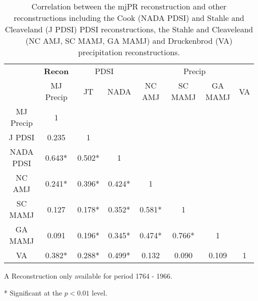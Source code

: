 \begin{table}
  \begin{center}
    \begin{threeparttable}[b]
      \begin{tabular}{cccccccc}
\toprule
 & \textbf{Recon} & \multicolumn{2}{c}{PDSI} & \multicolumn{4}{c}{Precip} \\ \cmidrule(lr){2-2} \cmidrule(lr){3-4} \cmidrule(lr){5-8}
 & MJ Precip & JT & NADA & NC AMJ & SC MAMJ & GA MAMJ & VA\tnote{A} \\  \midrule
MJ Precip &  1      & & & & & & \\
J PDSI    &  0.235  & 1      &        &         &        &       &   \\ 
NADA PDSI &  0.643* & 0.502* & 1      &         &        &       &   \\ 
NC AMJ    &  0.241* & 0.396* & 0.424* & 1       &        &       &   \\ 
SC MAMJ   &  0.127  & 0.178* & 0.352* & 0.581*  &  1     &       &   \\ 
GA MAMJ   &  0.091  & 0.196* & 0.345* & 0.474*  & 0.766* & 1     &   \\ 
VA        &  0.382* & 0.288* & 0.499* & 0.132   & 0.090  & 0.109 & 1 \\ \bottomrule
      \end{tabular}
      \caption{Correlation between the mjPR reconstruction and other reconstructions including the Cook (NADA PDSI) and Stahle and Cleaveland (J PDSI) PDSI reconstructions, the Stahle and Cleaveleand (NC AMJ, SC MAMJ, GA MAMJ) and Druckenbrod (VA) precipitation reconstructions.}
      \begin{tablenotes}
      \item [A] Reconstruction only available for period 1764 - 1966.
      \item [*] Significant at the $p<0.01$ level.
      \end{tablenotes}
    \end{threeparttable}
  \end{center}
  \label{table:reconComps1}
  \vspace{2cm}
\end{table}

